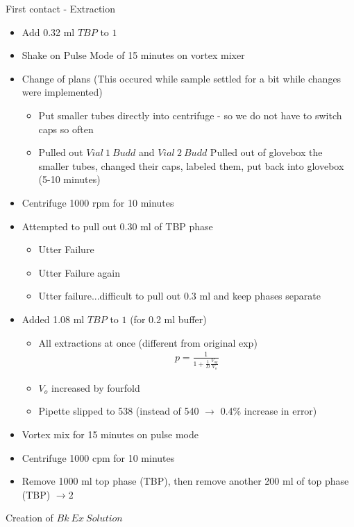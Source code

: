 \documentclass[idxtotoc,hyperref,openany,oneside]{labbook} %
\newcommand{\cmark}{\ding{51}}%
\newcommand{\done}{\rlap{$\square$}{\raisebox{2pt}{\large\hspace{1pt}\cmark}}%
  \hspace{-2.5pt}}
\begin{document}


\begin{todolist}
\item[\done]{First contact - Extraction}
  \begin{itemize}
  \item{Add 0.32 ml $\boxed{TBP}$ to $\boxed{1}$}
  \item{Shake on Pulse Mode of 15 minutes on vortex mixer}
  \item{Change of plans (This occured while sample settled for
       a bit while changes were implemented)}
    \begin{itemize}
    \item{Put smaller tubes directly into centrifuge - so we do not
      have to switch caps so often}
    \item{Pulled out $\boxed{Vial\ 1\ Budd}$ and $\boxed{Vial\ 2\ Budd}$
      Pulled out of glovebox the smaller tubes,
      changed their caps, labeled them, put back into
      glovebox (5-10 minutes)}
    \end{itemize}
  \item{Centrifuge 1000 rpm for 10 minutes}
  \item{Attempted to pull out 0.30 ml of TBP phase}
    \begin{itemize}
    \item{Utter Failure}
    \item{Utter Failure again}
    \item{Utter failure...difficult to pull out 0.3 ml and keep
    phases separate}
    \end{itemize}
  \item{Added 1.08 ml $\boxed{TBP}$ to $\boxed{1}$ (for 0.2 ml buffer)}
    \begin{itemize}
    \item{All extractions at once (different from original exp)}
      \begin{align*}
        p=\frac{1}{1+\frac{1}{D}\frac{V_{aq}}{V_o}}
      \end{align*}
    \item{$V_o$ increased by fourfold}
    \item{Pipette slipped to 538 (instead of 540 $\rightarrow$ 0.4\%
      increase in error)}
    \end{itemize}
  \item{Vortex mix for 15 minutes on pulse mode}
  \item{Centrifuge 1000 cpm for 10 minutes}
  \item{Remove 1000 ml top phase (TBP), then remove
    another 200 ml of top phase (TBP) $\boxed{\rightarrow 2}$}
  \end{itemize}
\item[\done]{Creation of $\boxed{Bk\ Ex\ Solution}$}
\end{todolist}
\end{document}
